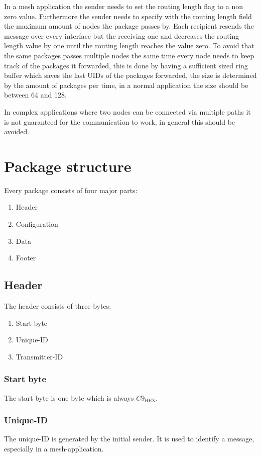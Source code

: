 \documentclass{scrreprt}
\begin{document}
In a mesh application the sender needs to set the routing length flag to a non zero value.
Furthermore the sender needs to specify with the routing length field the maximum amount of
nodes the package passes by.
Each recipient resends the message over every interface but the receiving one and decreases the routing length value by one
until the routing length reaches the value zero. To avoid that the same
packages passes multiple nodes the same time every node
needs to keep track of the packages it forwarded, this is done by having a
sufficient sized ring buffer which saves the last UIDs of the packages forwarded,
the size is determined by the amount of packages per time, in a normal application
the size should be between 64 and 128.

In complex applications where two nodes can be connected via multiple
paths it is not guaranteed for the communication to work, in general this should be
avoided.

\section{Package structure}
Every package consists of four major parts:
\begin{enumerate}
  \item Header
  \item Configuration
  \item Data
  \item Footer
\end{enumerate}

\subsection{Header}
The header consists of three bytes:
\begin{enumerate}
  \item Start byte
  \item Unique-ID
  \item Transmitter-ID
\end{enumerate}

\subsubsection{Start byte}
The start byte is one byte which is always ${C9}_\text{HEX}$.

\subsubsection{Unique-ID}
 The unique-ID is generated by the initial sender. It is used to identify a
 message, especially in a mesh-application.
\end{document}
